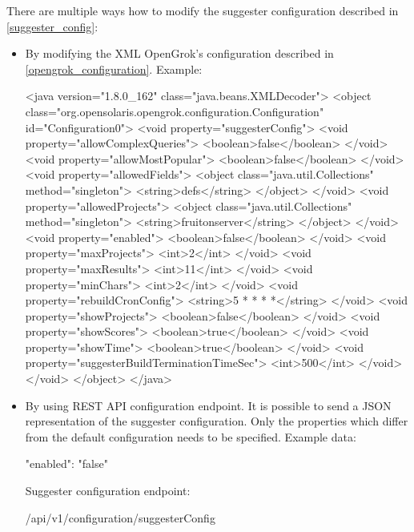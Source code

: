 There are multiple ways how to modify the suggester configuration described in \ref{suggester_config}:
\begin{itemize}
    \item By modifying the XML OpenGrok's configuration described in \ref{opengrok_configuration}. Example:
\begin{code}
<java version="1.8.0_162" class="java.beans.XMLDecoder">
  <object
      class="org.opensolaris.opengrok.configuration.Configuration"
      id="Configuration0">
    <void property="suggesterConfig">
      <void property="allowComplexQueries">
        <boolean>false</boolean>
      </void>
      <void property="allowMostPopular">
        <boolean>false</boolean>
      </void>
      <void property="allowedFields">
        <object class="java.util.Collections" method="singleton">
          <string>defs</string>
        </object>
      </void>
      <void property="allowedProjects">
        <object class="java.util.Collections" method="singleton">
          <string>fruitonserver</string>
        </object>
      </void>
      <void property="enabled">
        <boolean>false</boolean>
      </void>
      <void property="maxProjects">
        <int>2</int>
      </void>
      <void property="maxResults">
        <int>11</int>
      </void>
      <void property="minChars">
        <int>2</int>
      </void>
      <void property="rebuildCronConfig">
        <string>5 * * * *</string>
      </void>
      <void property="showProjects">
        <boolean>false</boolean>
      </void>
      <void property="showScores">
        <boolean>true</boolean>
      </void>
      <void property="showTime">
        <boolean>true</boolean>
      </void>
      <void property="suggesterBuildTerminationTimeSec">
        <int>500</int>
      </void>
    </void>
  </object>
</java>
\end{code}
    \item By using REST API configuration endpoint. It is possible to send a JSON representation of the suggester
    configuration. Only the properties which differ from the default configuration needs to be specified. Example data:
\begin{code}
{"enabled": "false"}
\end{code}
    Suggester configuration endpoint:
\begin{code}
/api/v1/configuration/suggesterConfig
\end{code}

\end{itemize}
